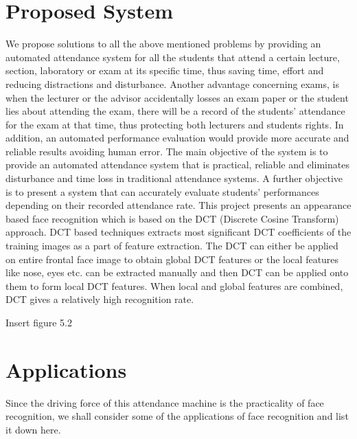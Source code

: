 \section{Proposed System}
We propose solutions to all the above mentioned problems by providing an automated attendance system for all the students that attend a certain lecture, section, laboratory or exam at its specific time, thus saving time, effort and reducing distractions and disturbance. Another advantage concerning exams, is when the lecturer or the advisor accidentally losses an exam paper or the student lies about attending the exam, there will be a record of the students’ attendance for the exam at that time, thus protecting both lecturers and students rights. In addition, an automated performance evaluation would provide more accurate and reliable results avoiding human error.
The main objective of the system is to provide an automated attendance system that is practical, reliable and eliminates disturbance and time loss in traditional attendance systems. A further objective is to present a system that can accurately evaluate students’ performances depending on their recorded attendance rate.
This project presents an appearance based face recognition which is based on the DCT (Discrete Cosine Transform) approach. DCT based techniques extracts most significant DCT coefficients of the training images as a part of feature extraction. The DCT can either be applied on entire frontal face image to obtain global DCT features or the local features like nose, eyes etc. can be extracted manually and then DCT can be applied onto them to form local DCT features. When local and global features are combined, DCT gives a relatively high recognition rate.

Insert figure 5.2
\section{Applications}
Since the driving force of this attendance machine is the practicality of face recognition, we shall consider some of the applications of face recognition and list it down here.
